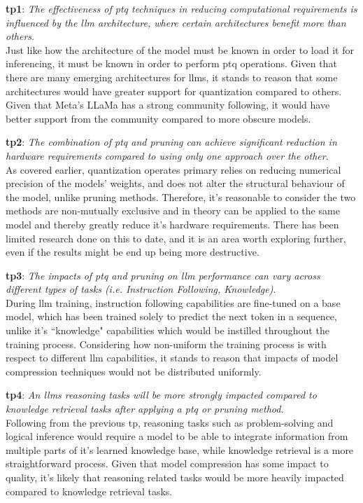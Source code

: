 \documentclass{ifacconf}
\begin{document}
	\textbf{\gls{tp}1}: \textit{The effectiveness of \gls{ptq} techniques in reducing computational requirements is influenced by the \gls{llm} architecture, where certain architectures benefit more than others}.\\
	Just like how the architecture of the model must be known in order to load it for inferencing, it must be known in order to perform \gls{ptq} operations. Given that there are many emerging architectures for \glspl{llm}, it stands to reason that some architectures would have greater support for quantization compared to others. Given that Meta's LLaMa has a strong community following, it would have better support from the community compared to more obscure models.
	
	
	\textbf{\gls{tp}2}: \textit{The combination of \gls{ptq} and pruning can achieve significant reduction in hardware requirements compared to using only one approach over the other}.\\
	As covered earlier, quantization operates primary relies on reducing numerical precision of the models' weights, and does not alter the structural behaviour of the model, unlike pruning methods. Therefore, it's reasonable to consider the two methods are non-mutually exclusive and in theory can be applied to the same model and thereby greatly reduce it's hardware requirements. There has been limited research done on this to date, and it is an area worth exploring further, even if the results might be end up being more destructive.
	
	\textbf{\gls{tp}3}: \textit{The impacts of \gls{ptq} and pruning on \gls{llm} performance can vary across different types of tasks (i.e. Instruction Following, Knowledge)}.\\
	During \gls{llm} training, instruction following capabilities are fine-tuned on a base model, which has been trained solely to predict the next token in a sequence, unlike it's ``knowledge" capabilities which would be instilled throughout the training process. Considering how non-uniform the training process is with respect to different \gls{llm} capabilities, it stands to reason that impacts of model compression techniques would not be distributed uniformly.
	
	
	\textbf{\gls{tp}4}: \textit{An \glspl{llm} reasoning tasks will be more strongly impacted compared to knowledge retrieval tasks after applying a \gls{ptq} or pruning method}.\\
	Following from the previous \gls{tp}, reasoning tasks such as problem-solving and logical inference would require a model to be able to integrate information from multiple parts of it's learned knowledge base, while knowledge retrieval is a more straightforward process. Given that model compression has some impact to quality, it's likely that reasoning related tasks would be more heavily impacted compared to knowledge retrieval tasks.
	
\end{document}
